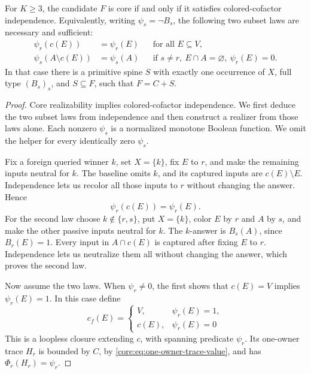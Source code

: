 \begin{theorem}
\label{core:thm:one-owner-source-interval}
For $K\geq3$, the candidate $F$ is core if and only if it satisfies
colored-cofactor independence. Equivalently, writing $\psi_s=\neg B_s$,
the following two subset laws are necessary and sufficient:
\begin{align*}
 \psi_r(c(E))&=\psi_r(E)&&\text{for all }E\subseteq V,\\
 \psi_s(A\setminus c(E))&=\psi_s(A)
 &&\text{if }s\ne r,\ E\cap A=\varnothing,\ \psi_r(E)=0.
\end{align*}
In that case there is a primitive spine
$S$ with exactly one occurrence of $X$, full type $(B_s)_s$, and
$S\subseteq F$, such that $F=C+S$.
\end{theorem}
\begin{proof}
Core realizability implies colored-cofactor independence. We first
deduce the two subset laws from independence and then construct a
realizer from those laws alone. Each nonzero $\psi_s$ is a normalized monotone
Boolean function. We omit the helper for every identically zero
$\psi_s$.

Fix a foreign queried winner $k$, set
$X=\{k\}$, fix $E$ to $r$, and make the remaining inputs neutral
for $k$. The baseline omits $k$, and its captured inputs are
$c(E)\setminus E$. Independence lets us recolor all those inputs
to $r$ without changing the answer. Hence
\[
 \psi_r(c(E))=\psi_r(E).
\]
For the second law choose $k\notin\{r,s\}$, put $X=\{k\}$,
color $E$ by $r$ and $A$ by $s$, and make the other passive inputs
neutral for $k$. The $k$-answer is $B_s(A)$, since $B_r(E)=1$.
Every input in $A\cap c(E)$ is captured after fixing $E$ to $r$.
Independence lets us neutralize them all without changing the answer,
which proves the second law.

Now assume the two laws. When $\psi_r\ne0$, the first shows that
$c(E)=V$ implies $\psi_r(E)=1$. In this case define
\[
 c_f(E)=\begin{cases}V,&\psi_r(E)=1,\\c(E),&\psi_r(E)=0\end{cases}
\]
This is a loopless closure extending $c$, with spanning predicate $\psi_r$.
Its one-owner trace $H_r$ is bounded by $C$, by
\eqref{core:eq:one-owner-trace-value}, and has
$\Phi_r(H_r)=\psi_r$.


\end{proof}
